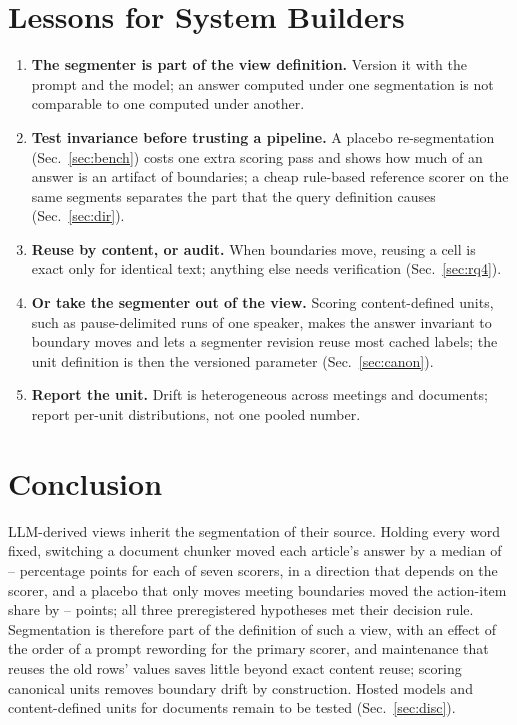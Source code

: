 \documentclass[conference]{IEEEtran}
\begin{document}
\section{Lessons for System Builders}\label{sec:lessons}
\begin{enumerate}[leftmargin=*,nosep]
\item \textbf{The segmenter is part of the view definition.} Version it with the prompt and the model; an answer
computed under one segmentation is not comparable to one computed under another.
\item \textbf{Test invariance before trusting a pipeline.} A placebo re-segmentation (Sec.~\ref{sec:bench}) costs one
extra scoring pass and shows how much of an answer is an artifact of boundaries; a cheap rule-based reference scorer
on the same segments separates the part that the query definition causes (Sec.~\ref{sec:dir}).
\item \textbf{Reuse by content, or audit.} When boundaries move, reusing a cell is exact only for identical text;
anything else needs verification (Sec.~\ref{sec:rq4}).
\item \textbf{Or take the segmenter out of the view.} Scoring content-defined units, such as pause-delimited runs of
one speaker, makes the answer invariant to boundary moves and lets a segmenter revision reuse most cached labels;
the unit definition is then the versioned parameter (Sec.~\ref{sec:canon}).
\item \textbf{Report the unit.} Drift is heterogeneous across meetings and documents; report per-unit distributions,
not one pooled number.
\end{enumerate}

\section{Conclusion}
LLM-derived views inherit the segmentation of their source. Holding every word fixed, switching a document chunker
moved each article's answer by a median of \nSixChunkAbsMin--\nSixChunkAbsMax{} percentage points for each of seven
scorers, in a direction that depends on the scorer, and a placebo that only moves meeting boundaries moved the
action-item share by \nSixPlaceboAbsMin--\nSixPlaceboAbsMax{} points; all three preregistered hypotheses met their
decision rule. Segmentation is therefore part of the definition of such a view, with an effect of the order of a prompt
rewording for the primary scorer, and maintenance that reuses the old rows' values saves little beyond exact content
reuse; scoring canonical units removes boundary drift by construction. Hosted models and content-defined units for
documents remain to be tested (Sec.~\ref{sec:disc}).
\end{document}
